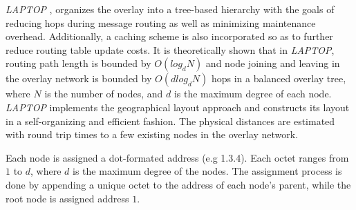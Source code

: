\emph{LAPTOP} \cite{WLH2007}, organizes the overlay into a tree-based hierarchy
with the goals of reducing hops during message routing as well as minimizing
maintenance overhead. Additionally, a caching scheme is also incorporated so as
to further reduce routing table update costs. It is theoretically shown
that in \emph{LAPTOP}, routing path length is bounded by $O(log_d N)$ and node joining
and leaving in the overlay network is bounded by $O\left( d log_d N \right)$
hops in a balanced overlay tree, where $N$ is the number of nodes, and $d$ is
the maximum degree of each node. \emph{LAPTOP} implements the geographical layout
approach  and constructs its layout in a self-organizing and efficient fashion.
The physical distances are estimated with round trip times to a few existing
nodes in the overlay network.

Each node is assigned a dot-formated address (e.g 1.3.4). Each octet ranges from
$1$ to $d$, where $d$ is the maximum degree of the nodes. The assignment process
is done by appending a unique octet to the address of each node's parent, while
the root node is assigned address $1$.

%

